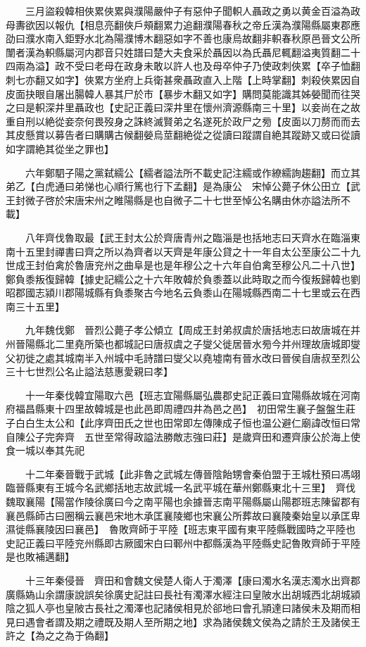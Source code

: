 　　三月盜殺韓相俠累俠累與濮陽嚴仲子有惡仲子聞軹人聶政之勇以黄金百溢為政母夀欲因以報仇【相息亮翻俠戶頰翻累力追翻濮陽春秋之帝丘漢為濮陽縣屬東郡應劭曰濮水南入鉅野水北為陽濮博木翻惡如字不善也康烏故翻非軹春秋原邑晉文公所闈者漢為軹縣屬河内郡音只姓譜曰楚大夫食采於聶因以為氏聶尼輒翻溢夷質翻二十四兩為溢】政不受曰老母在政身未敢以許人也及母卒仲子乃使政刺俠累【卒子恤翻刺七亦翻又如字】俠累方坐府上兵衛甚衆聶政直入上階【上時掌翻】刺殺俠累因自皮面抉眼自屠出腸韓人暴其尸於市【暴步木翻又如字】購問莫能識其姊嫈聞而往哭之曰是軹深井里聶政也【史記正義曰深井里在懷州濟源縣南三十里】以妾尚在之故重自刑以絶從妾奈何畏歿身之誅終滅賢弟之名遂死於政尸之㫄【皮面以刀剺而而去其皮懸賞以募告者曰購購古候翻嫈烏莖翻絶從之從讀曰蹤謂自絶其蹤跡又或曰從讀如字謂絶其從坐之罪也】

　　六年鄭駟子陽之黨弑繻公【繻者謚法所不載史記注繻或作繚繻詢趨翻】而立其弟乙【白虎通曰弟悌也心順行篤也行下孟翻】是為康公　宋悼公薨子休公田立【武王封微子啓於宋唐宋州之睢陽縣是也自微子二十七世至悼公名購由休亦謚法所不載】

　　八年齊伐魯取最【武王封太公於齊唐青州之臨淄是也括地志曰天齊水在臨淄東南十五里封禪書曰齊之所以為齊者以天齊是年康公貸之十一年自太公至康公二十九世成王封伯禽於魯唐兖州之曲阜是也是年穆公之十六年自伯禽至穆公凡二十八世】　鄭負黍叛復歸韓【據史記繻公之十六年敗韓於負黍蓋以此時取之而今復叛歸韓也劉昭郡國志潁川郡陽城縣有負黍聚古今地名云負黍山在陽城縣西南二十七里或云在西南三十五里】

　　九年魏伐鄭　晉烈公薨子孝公傾立【周成王封弟叔虞於唐括地志曰故唐城在并州晉陽縣北二里堯所築也都城記曰唐叔虞之子燮父徙居晉水㫄今并州理故唐城即燮父初徙之處其城南半入州城中毛詩譜曰燮父以堯墟南有晉水改曰晉侯自唐叔至烈公三十七世烈公名止謚法慈惠愛親曰孝】

　　十一年秦伐韓宜陽取六邑【班志宜陽縣屬弘農郡史記正義曰宜陽縣故城在河南府福昌縣東十四里故韓城是也此邑即周禮四井為邑之邑】　初田常生襄子盤盤生莊子白白生太公和【此序齊田氏之世也田常即左傳陳成子恒也温公避仁廟諱改恒曰常自陳公子完奔齊　五世至常得政謚法勝敵志強曰莊】是歲齊田和遷齊康公於海上使食一城以奉其先祀

　　十二年秦晉戰于武城【此非魯之武城左傳晉陰飴甥會秦伯盟于王城杜預曰馮翊臨晉縣東有王城今名武鄉括地志故武城一名武平城在華州鄭縣東北十三里】　齊伐魏取襄陽【陽當作陵徐廣曰今之南平陽也余據晉志南平陽縣屬山陽郡班志陳留郡有襄邑縣師古曰圈稱云襄邑宋地木承匡襄陵鄉也宋襄公所葬故曰襄陵秦始皇以承匡卑濕徙縣襄陵因曰襄邑】　魯敗齊師于平陸【班志東平國有東平陸縣戰國時之平陸也史記正義曰平陸兖州縣即古厥國宋白曰鄆州中都縣漢為平陸縣史記魯敗齊師于平陸是也敗補邁翻】

　　十三年秦侵晉　齊田和會魏文侯楚人衛人于濁澤【康曰濁水名漢志濁水出齊郡廣縣媯山余謂康說誤矣徐廣史記註曰長社有濁澤水經注曰皇陂水出胡城西北胡城潁陰之狐人亭也皇陂古長社之濁澤也記諸侯相見於郤地曰會孔頴達曰諸侯未及期而相見曰遇會者謂及期之禮既及期人至所期之地】求為諸侯魏文侯為之請於王及諸侯王許之【為之之為于偽翻】

